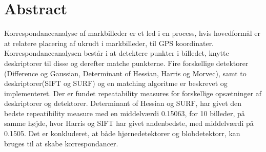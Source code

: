\chapter{Abstract} \label{sec:abstract}
Korrespondanceanalyse af markbilleder er et led i en process, hvis hovedformål er at relatere placering af ukrudt i markbilleder, til GPS koordinater. Korrespondanceanalysen består i at detektere punkter i billedet, knytte deskriptorer til disse og derefter matche punkterne. Fire forskellige detektorer (Difference og Gaussian, Determinant of Hessian, Harris og Morvec), samt to deskriptorer(SIFT og SURF) og en matching algoritme er beskrevet og implementeret. Der er fundet repeatability measures for forskellige opsætninger af deskriptorer og detektorer. Determinant of Hessian og SURF, har givet den bedste repeatibility measure med en middelværdi 0.15063, for 10 billeder, på samme højde, hvor Harris og SIFT har givet andenbedste, med middelværdi på 0.1505. Det er konkluderet, at både hjørnedetektorer og blobdetektorr, kan bruges til at skabe korrespondancer.